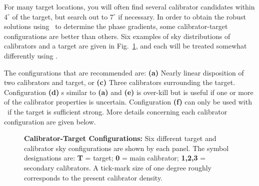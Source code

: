       For many target locations, you will often find several
calibrator candidates within $4^\circ$ of the target, but search out
to $7^\circ$ if necessary.  In order to obtain the robust solutions
using \ATMCA~to determine the phase gradients, some calibrator-target
configurations are better than others.  Six examples of sky
distributions of calibrators and a target are given in
Fig.~\ref{fig1}, and each will be treated somewhat differently using
\ATMCA.

    The configurations that are recommended are: {\bf (a)} Nearly
linear disposition of two calibrators and target, or {\bf (c)} Three
calibrators surrounding the target.  Configuration {\bf (d)} s
similar to {\bf (a)} and {\bf (e)} is over-kill but is useful if one
or more of the calibrator properties is uncertain.  Configuration {\bf
(f)} can only be used with \ATMCA~if the target is sufficient strong.
More details concerning each calibrator configuration are given below.

\begin{figure}[t!]
\vskip -0.8in
\caption{\small
{\bf Calibrator-Target Configurations:}  Six different target and
calibrator sky configurations are shown by each panel.  The symbol designations
are: {\bf T} = target; {\bf 0} = main calibrator; {\bf 1,2,3} = secondary
calibrators.  A tick-mark size of one degree roughly corresponds to the
present calibrator density.\normalsize}
\label{fig1}
\end{figure}

